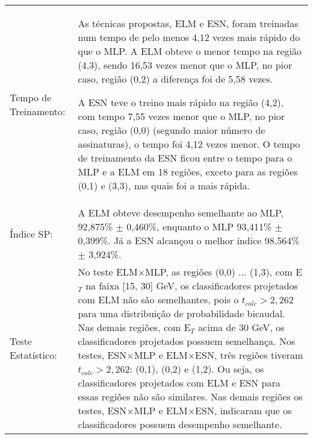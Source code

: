 \begin{center}
\begin{small}
\begin{longtable}[H]{p{3.8cm}p{11cm}}
Tempo de Treinamento: & As técnicas propostas, ELM  e ESN, foram treinadas num tempo de pelo menos 4,12 vezes mais rápido do que o MLP. A ELM obteve o menor tempo na região (4,3), sendo 16,53 vezes menor que o MLP, no pior caso, região (0,2) a diferença foi de 5,58 vezes.

						A ESN teve o treino mais rápido na região (4,2), com tempo 7,55 vezes menor que o MLP, no pior caso, região (0,0) (segundo maior número de assinaturas), o tempo foi 4,12 vezes menor. O tempo de treinamento da ESN ficou entre o tempo para o MLP e a ELM em 18 regiões, exceto para as regiões (0,1) e (3,3), nas quais foi a mais rápida.\\ \cmidrule(lr){2-2}

Índice SP:            & A ELM obteve desempenho semelhante ao MLP, 92,875\% $\pm$ 0,460\%, enquanto o MLP 93,411\% $\pm$ 0,399\%. Já a ESN alcançou o melhor índice 98,564\% $\pm$ 3,924\%. \\ \cmidrule(lr){2-2}

Teste Estatístico:    & No teste ELM$\times$MLP, as regiões (0,0) $\ldots$ (1,3), com E$_T$ na faixa [15, 30] GeV, os classificadores projetados com ELM não são semelhantes, pois o $t_{calc}>2,262$ para uma distribuição de probabilidade bicaudal. Nas demais regiões, com E$_T$ acima de 30 GeV, os classificadores projetados possuem semelhança.
						Nos testes, ESN$\times$MLP e ELM$\times$ESN, três regiões tiveram $t_{calc}>2,262$: (0,1), (0,2) e (1,2). Ou seja, os classificadores projetados com ELM e ESN para essas regiões não são similares. Nas demais regiões os testes, ESN$\times$MLP e ELM$\times$ESN, indicaram que os classificadores possuem desempenho semelhante.
\\ \bottomrule

	\end{longtable}
	\end{small}
\end{center}




